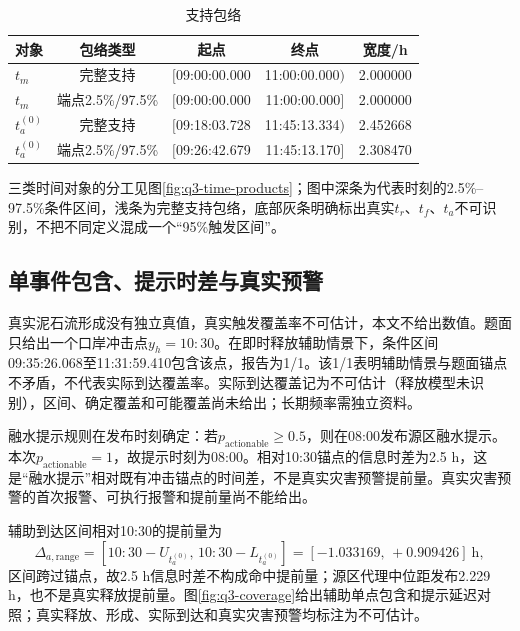 \begin{table}[htbp]\centering\footnotesize
\caption{支持包络}\label{tab:q3-envelopes}
\begin{tabular}{@{}l c c c c@{}}\toprule
对象&包络类型&起点&终点&宽度/h\\\midrule
$t_m$&完整支持&$[$09:00:00.000&11:00:00.000$)$&2.000000\\
$t_m$&端点2.5\%/97.5\%&$[$09:00:00.000&11:00:00.000$]$&2.000000\\
$t_a^{(0)}$&完整支持&$[$09:18:03.728&11:45:13.334$)$&2.452668\\
$t_a^{(0)}$&端点2.5\%/97.5\%&$[$09:26:42.679&11:45:13.170$]$&2.308470\\
\bottomrule
\end{tabular}\end{table}

三类时间对象的分工见图\ref{fig:q3-time-products}；图中深条为代表时刻的2.5\%--97.5\%条件区间，浅条为完整支持包络，底部灰条明确标出真实$t_r$、$t_f$、$t_a$不可识别，不把不同定义混成一个“95\%触发区间”。


\subsection{单事件包含、提示时差与真实预警}
真实泥石流形成没有独立真值，真实触发覆盖率不可估计，本文不给出数值。题面只给出一个口岸冲击点$y_h=10{:}30$。在即时释放辅助情景下，条件区间09:35:26.068至11:31:59.410包含该点，报告为1/1。该1/1表明辅助情景与题面锚点不矛盾，不代表实际到达覆盖率。实际到达覆盖记为不可估计（释放模型未识别），区间、确定覆盖和可能覆盖尚未给出；长期频率需独立资料。

融水提示规则在发布时刻确定：若$p_{\mathrm{actionable}}\ge0.5$，则在08:00发布源区融水提示。本次$p_{\mathrm{actionable}}=1$，故提示时刻为08:00。相对10:30锚点的信息时差为2.5 h，这是“融水提示”相对既有冲击锚点的时间差，不是真实灾害预警提前量。真实灾害预警的首次报警、可执行报警和提前量尚不能给出。

辅助到达区间相对10:30的提前量为
\begin{equation}
\Delta_{a,\mathrm{range}}
=[10{:}30-U_{t_a^{(0)}},\,10{:}30-L_{t_a^{(0)}}]
=[-1.033169,\,+0.909426]\ \mathrm{h},
\end{equation}
区间跨过锚点，故2.5 h信息时差不构成命中提前量；源区代理中位距发布2.229 h，也不是真实释放提前量。图\ref{fig:q3-coverage}给出辅助单点包含和提示延迟对照；真实释放、形成、实际到达和真实灾害预警均标注为不可估计。

